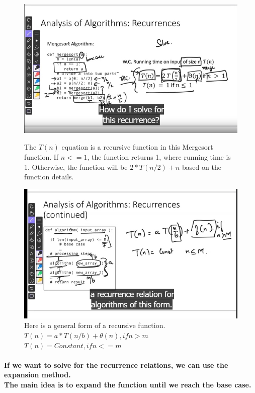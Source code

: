 \documentclass{article}
\begin{document}
\begin{figure}[H]
    \includegraphics[width=\textwidth]{recurrencerelations.png}
    \caption{The $T(n)$ equation is a recursive function in this Mergesort function. 
    If $n<=1$, the function returns 1, where running time is 1. Otherwise, the function will be
    $2*T(n/2) + n$ based on the function details.\\}
    \includegraphics[width=\textwidth]{recurrencerelations2.png}
    \caption{Here is a general form of a recursive function. \\
    $T(n) = a*T(n/b) + \theta(n), if n > m$\\
    $T(n) = Constant, if n <= m$}
\end{figure}

\paragraph{If we want to solve for the recurrence relations, we can use the expansion method.\\
The main idea is to expand the function until we reach the base case.\\}
\end{document}
